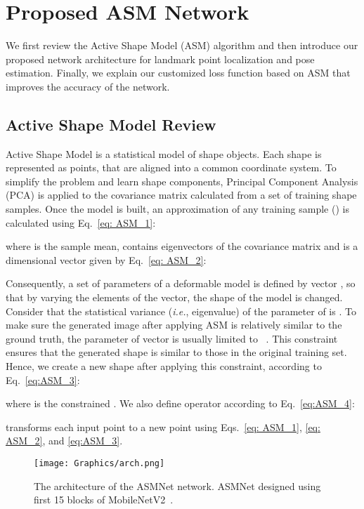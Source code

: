 \documentclass[final]{cvpr}
\begin{document}
\section{Proposed ASM Network}
\label{sec:ASMNet}
We first review the Active Shape Model (ASM) algorithm and then introduce our proposed network architecture for landmark point localization and pose estimation. Finally, we explain our customized loss function based on ASM that improves the accuracy of the network. 

\subsection{Active Shape Model Review} \label{sec:asm_review}
Active Shape Model is a statistical model of shape objects. Each shape is represented as  points,  that are aligned into a common coordinate system. To simplify the problem and learn shape components, Principal Component Analysis (PCA) is applied to the covariance matrix calculated from a set of  training shape samples. Once the model is built, an approximation of any training sample () is calculated using Eq.~\ref{eq: ASM_1}:

where  is the sample mean,   contains  eigenvectors of the covariance matrix and  is a  dimensional vector given by Eq.~\ref{eq: ASM_2}: 

Consequently, a set of parameters of a deformable model is defined by vector , so that by varying the elements of the vector, the shape of the model is changed. Consider that the statistical variance (\textit{i.e.}, eigenvalue) of the  parameter of  is . To make sure the generated image after applying ASM is relatively similar to the ground truth, the parameter  of vector  is usually limited to ~\cite{cootes2000introduction}. This constraint ensures that the generated shape is similar to those in the original training set. Hence, we create a new shape  after applying this constraint, according to Eq.~\ref{eq:ASM_3}:

where  is the constrained . We also define  operator according to Eq.~\ref{eq:ASM_4}:

 transforms each input point  to a new point  using Eqs.~\ref{eq: ASM_1}, \ref{eq: ASM_2}, and \ref{eq:ASM_3}.

\begin{figure}[t!]
  \centering
  \texttt{[image: Graphics/arch.png]}
  \caption{The architecture of the ASMNet network. ASMNet designed using first 15 blocks of MobileNetV2~\cite{sandler2018mobilenetv2}.}
  \label{fig:arch}
\end{figure}
\end{document}
